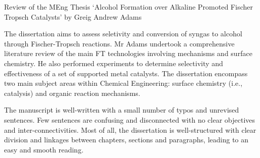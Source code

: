 \documentclass[14pt,twoside]{report}
\begin{document}
\vfill
\clearpage

\vfill

\clearpage




\bigskip

\begin{center}
  {\Large Review of the MEng Thesis `Alcohol Formation over Alkaline Promoted Fischer Tropsch Catalysts' by Greig Andrew Adams}
\end{center}
The dissertation aims to assess seletivity and conversion of syngas to alcohol through Fischer-Tropsch reactions. Mr Adams undertook a comprehensive literature review of the main FT technologies involving mechanisms and surface chemistry. He also performed experiments to determine selectivity and effectiveness of a set of supported metal catalysts. The dissertation encompass two main subject areas within Chemical Engineering: surface chemistry (i.e., catalysis) and organic reaction mechanisms.

The manuscript is well-written with a small number of typos and unrevised sentences. Few sentences are confusing and disconnected with no clear objectives and inter-connectivities. Most of all, the dissertation is well-structured with clear division and linkages between chapters, sections and paragraphs, leading to an easy and smooth reading.
\end{document}
